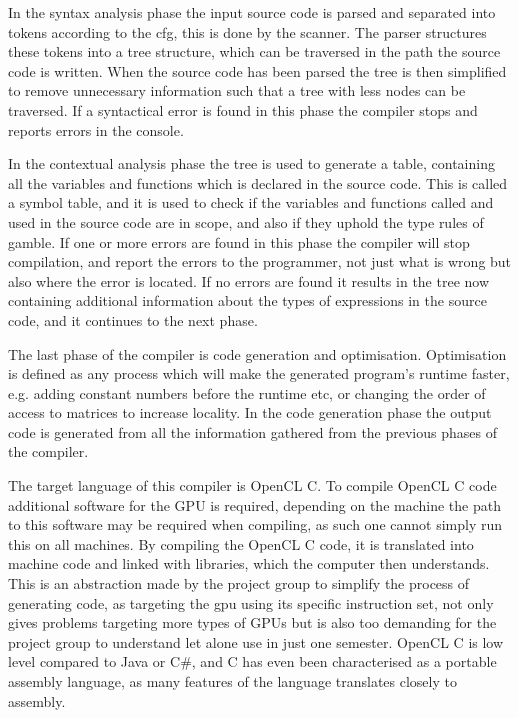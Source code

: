 In the syntax analysis phase the input source code is parsed and separated into tokens according to the \acrshort{cfg}, this is done by the scanner. 
The parser structures these tokens into a tree structure, which can be traversed in the path the source code is written.
When the source code has been parsed the tree is then simplified to remove unnecessary information such that a tree with less nodes can be traversed.
If a syntactical error is found in this phase the compiler stops and reports errors in the console.

In the contextual analysis phase the tree is used to generate a table, containing all the variables and functions which is declared in the source code.
This is called a symbol table, and it is used to check if the variables and functions called and used in the source code are in scope, and also if they uphold the type rules of \gls{gamble}.
If one or more errors are found in this phase the compiler will stop compilation, and report the errors to the programmer, not just what is wrong but also where the error is located.
If no errors are found it results in the tree now containing additional information about the types of expressions in the source code, and it continues to the next phase.

The last phase of the compiler is code generation and optimisation.
Optimisation is defined as any process which will make the generated program's runtime faster, e.g. adding constant numbers before the runtime etc, or changing the order of access to matrices to increase locality. 
In the code generation phase the output code is generated from all the information gathered from the previous phases of the compiler.

The target language of this compiler is OpenCL C.
To compile OpenCL C code additional software for the GPU is required, depending on the machine the path to this software may be required when compiling, as such one cannot simply run this on all machines.
By compiling the OpenCL C code, it is translated into machine code and linked with libraries, which the computer then understands.
This is an abstraction made by the project group to simplify the process of generating code, as targeting the \acrshort{gpu} using its specific instruction set, not only gives problems targeting more types of GPUs but is also too demanding for the project group to understand let alone use in just one semester.
OpenCL C is low level compared to Java or C\#, and C has even been characterised as a portable assembly language, as many features of the language translates closely to assembly. \citep{CPort}

